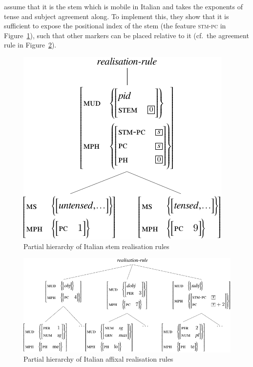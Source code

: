 \documentclass[output=paper
                ,modfonts
                ,nonflat
	        ,collection
	        ,collectionchapter
	        ,collectiontoclongg
 	        ,biblatex
                ,babelshorthands
                ,newtxmath
                ,draftmode
                ,colorlinks, citecolor=brown
] {langscibook}
\begin{document}
{\citet{Crysmann:Bonami:2016} assume that it is the stem which is
mobile in Italian and takes the exponents of tense and subject
agreement along. To implement this, they show that it is sufficient to
expose the positional index of the stem (the feature \textsc{stm-pc}
in Figure~\ref{fig:ItalianStem}), such that other markers can
be placed relative to it (cf.~the agreement rule in Figure~\ref{fig:ItalianAff}).  

\begin{figure}[htb]\centering
  
  \includegraphics[scale=.9]{figures/italian-stem-crop}
  
  \caption{Partial hierarchy of Italian stem realisation rules}
  \label{fig:ItalianStem}
\end{figure}

\begin{figure}[htb]
  \centering
  \includegraphics[scale=.84]{figures/italian-affix-crop}
  
  \caption{Partial hierarchy of Italian affixal realisation rules}
  \label{fig:ItalianAff}
\end{figure}



}
\end{document}

